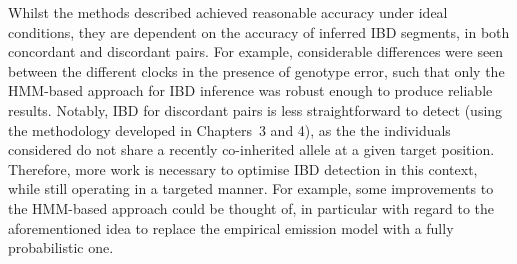 Whilst the methods described achieved reasonable accuracy under ideal conditions, they are dependent on the accuracy of inferred IBD segments, in both concordant and discordant pairs.
For example, considerable differences were seen between the different clocks in the presence of genotype error, such that only the HMM-based approach for IBD inference was robust enough to produce reliable results.
Notably, IBD for discordant pairs is less straightforward to detect (using the methodology developed in Chapters~3 and 4), as the the  individuals considered do not share a recently co-inherited allele at a given target position.
Therefore, more work is necessary to optimise IBD detection in this context, while still operating in a targeted manner.
For example, some improvements to the HMM-based approach could be thought of, in particular with regard to the aforementioned idea to replace the empirical emission model with a fully probabilistic one.

%
%
%
%
%
%
%
%

